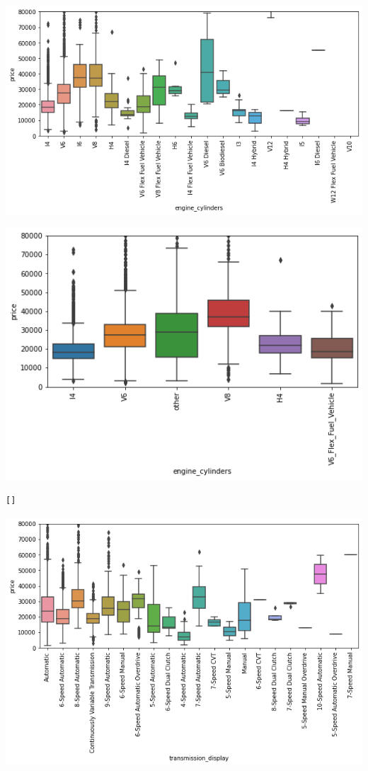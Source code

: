 \documentclass[
  letterpaper,
  DIV=11,
  numbers=noendperiod]{scrartcl}
\begin{document}
\includegraphics{Final Project Report - Used Cars Regression_files/figure-pdf/cell-7-output-2.png}

\includegraphics{Final Project Report - Used Cars Regression_files/figure-pdf/cell-7-output-3.png}

\begin{verbatim}
[]
\end{verbatim}

\includegraphics{Final Project Report - Used Cars Regression_files/figure-pdf/cell-8-output-2.png}
\end{document}
